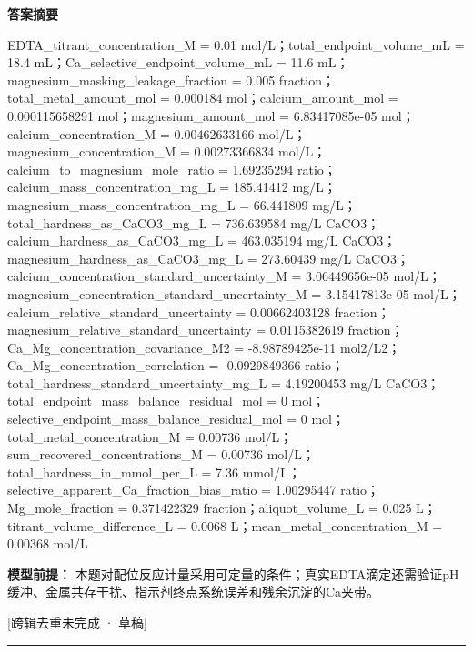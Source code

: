 \documentclass[UTF8,11pt,a4paper]{ctexart}
\begin{document}
\noindent\textbf{答案摘要}\par
EDTA\_titrant\_concentration\_M = 0.01 mol/L；total\_endpoint\_volume\_mL = 18.4 mL；Ca\_selective\_endpoint\_volume\_mL = 11.6 mL；magnesium\_masking\_leakage\_fraction = 0.005 fraction；total\_metal\_amount\_mol = 0.000184 mol；calcium\_amount\_mol = 0.000115658291 mol；magnesium\_amount\_mol = 6.83417085e-05 mol；calcium\_concentration\_M = 0.00462633166 mol/L；magnesium\_concentration\_M = 0.00273366834 mol/L；calcium\_to\_magnesium\_mole\_ratio = 1.69235294 ratio；calcium\_mass\_concentration\_mg\_L = 185.41412 mg/L；magnesium\_mass\_concentration\_mg\_L = 66.441809 mg/L；total\_hardness\_as\_CaCO3\_mg\_L = 736.639584 mg/L CaCO3；calcium\_hardness\_as\_CaCO3\_mg\_L = 463.035194 mg/L CaCO3；magnesium\_hardness\_as\_CaCO3\_mg\_L = 273.60439 mg/L CaCO3；calcium\_concentration\_standard\_uncertainty\_M = 3.06449656e-05 mol/L；magnesium\_concentration\_standard\_uncertainty\_M = 3.15417813e-05 mol/L；calcium\_relative\_standard\_uncertainty = 0.00662403128 fraction；magnesium\_relative\_standard\_uncertainty = 0.0115382619 fraction；Ca\_Mg\_concentration\_covariance\_M2 = -8.98789425e-11 mol2/L2；Ca\_Mg\_concentration\_correlation = -0.0929849366 ratio；total\_hardness\_standard\_uncertainty\_mg\_L = 4.19200453 mg/L CaCO3；total\_endpoint\_mass\_balance\_residual\_mol = 0 mol；selective\_endpoint\_mass\_balance\_residual\_mol = 0 mol；total\_metal\_concentration\_M = 0.00736 mol/L；sum\_recovered\_concentrations\_M = 0.00736 mol/L；total\_hardness\_in\_mmol\_per\_L = 7.36 mmol/L；selective\_apparent\_Ca\_fraction\_bias\_ratio = 1.00295447 ratio；Mg\_mole\_fraction = 0.371422329 fraction；aliquot\_volume\_L = 0.025 L；titrant\_volume\_difference\_L = 0.0068 L；mean\_metal\_concentration\_M = 0.00368 mol/L\par
\noindent\textbf{模型前提：}
本题对配位反应计量采用可定量的条件；真实EDTA滴定还需验证pH缓冲、金属共存干扰、指示剂终点系统误差和残余沉淀的Ca夹带。\par
\noindent\textcolor{red!65!black}{[跨辑去重未完成 · 草稿]} \par
\medskip\hrule\medskip
{}
\end{document}
